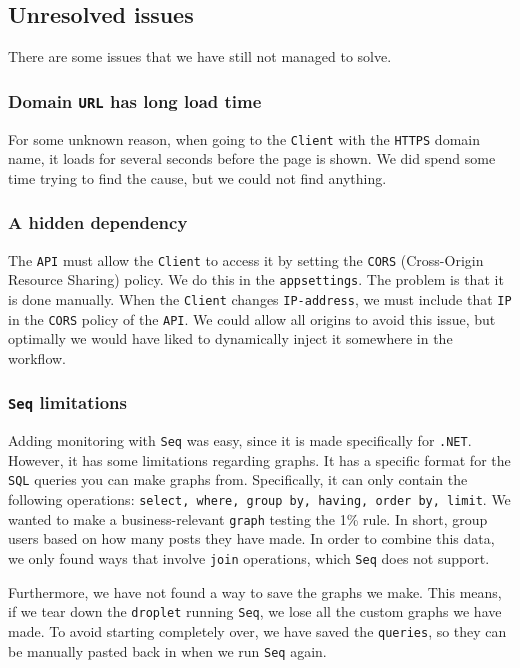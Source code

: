 \subsection{Unresolved issues}

There are some issues that we have still not managed to solve.

\subsubsection{Domain \texttt{URL} has long load time}

For some unknown reason, when going to the \texttt{Client} with the \texttt{HTTPS} domain name, 
it loads for several seconds before the page is shown.
We did spend some time trying to find the cause,
but we could not find anything.

\subsubsection{A hidden dependency}

The \texttt{API} must allow the \texttt{Client} to access it by 
setting the \texttt{CORS} (Cross-Origin Resource Sharing) policy.
We do this in the \texttt{appsettings}. The problem is that it is done manually.
When the \texttt{Client} changes \texttt{IP-address}, we must include 
that \texttt{IP} in the \texttt{CORS} policy of the \texttt{API}.
We could allow all origins to avoid this issue, 
but optimally we would have liked to dynamically 
inject it somewhere in the workflow.

\subsubsection{\texttt{Seq} limitations}

Adding monitoring with \texttt{Seq} was easy, since it is made specifically for \texttt{.NET}.
However, it has some limitations regarding graphs.
It has a specific format for the \texttt{SQL} queries you can make graphs from.
Specifically, it can only contain the following operations:
\texttt{select, where, group by, having, order by, limit}.
We wanted to make a business-relevant \texttt{graph} testing the 1\% rule\cite{1_perc_rule}.
In short, group users based on how many posts they have made.
In order to combine this data, we only found ways that involve 
\texttt{join} operations, which \texttt{Seq} does not support.

Furthermore, we have not found a way to save the graphs we make.
This means, if we tear down the \texttt{droplet} running \texttt{Seq},
we lose all the custom graphs we have made.
To avoid starting completely over, we have saved the \texttt{queries},
so they can be manually pasted back in when we run \texttt{Seq} again.

